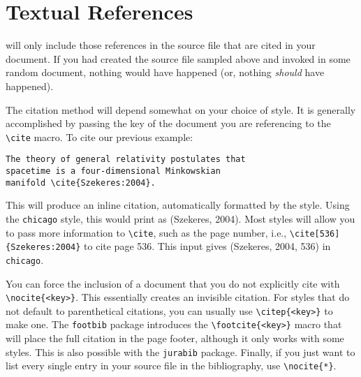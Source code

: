 \section{Textual References}
\label{sec:textual-references}

\BibTeX{} will only include those references in the source file that
are cited in your document.  If you had created the source file
sampled above and invoked \BibTeX{} in some random document, nothing
would have happened (or, nothing \emph{should} have happened).

The citation method will depend somewhat on your choice of style.  It
is generally accomplished by passing the key of the document you are
referencing to the \verb|\cite| macro.  To cite our previous example:
\begin{verbatim}
The theory of general relativity postulates that
spacetime is a four-dimensional Minkowskian
manifold \cite{Szekeres:2004}.
\end{verbatim}
This will produce an inline citation, automatically formatted by the
style.  Using the \texttt{chicago} style, this would print as
(Szekeres, 2004).  Most styles will allow you to pass more information
to \verb|\cite|, such as the page number, i.e.,
\verb|\cite[536]{Szekeres:2004}| to cite page 536.  This input gives
(Szekeres, 2004, 536) in \texttt{chicago}.

You can force the inclusion of a document that you do not explicitly
cite with \verb|\nocite{<key>}|.  This essentially creates an
invisible citation.  For styles that do not default to parenthetical
citations, you can usually use \verb|\citep{<key>}| to make one.  The
\texttt{footbib} package introduces the \verb|\footcite{<key>}| macro
that will place the full citation in the page footer, although it only
works with some styles.  This is also possible with the
\texttt{jurabib} package.  Finally, if you just want to list every
single entry in your source file in the bibliography, use
\verb|\nocite{*}|.

